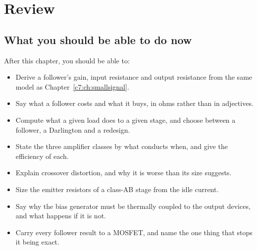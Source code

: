 

\section{Review}
\label{c8:sec:review}

\subsection*{What you should be able to do now}
After this chapter, you should be able to:
\begin{itemize}
  \item Derive a follower's gain, input resistance and output resistance from the same model as Chapter~\ref{c7:ch:smallsignal}.
  \item Say what a follower costs and what it buys, in ohms rather than in adjectives.
  \item Compute what a given load does to a given stage, and choose between a follower, a Darlington and a redesign.
  \item State the three amplifier classes by what conducts when, and give the efficiency of each.
  \item Explain crossover distortion, and why it is worse than its size suggests.
  \item Size the emitter resistors of a class-AB stage from the idle current.
  \item Say why the bias generator must be thermally coupled to the output devices, and what happens if it is not.
  \item Carry every follower result to a MOSFET, and name the one thing that stops it being exact.
\end{itemize}

